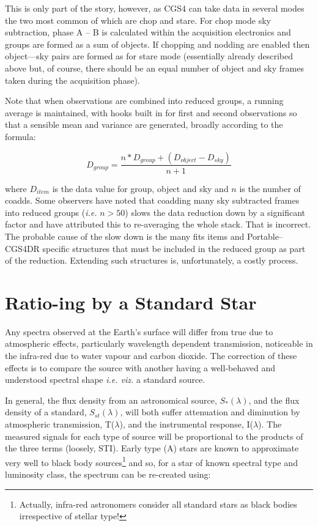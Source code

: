 \documentclass[a4paper]{book}
\renewcommand{\_}{{\tt\char'137}}
\begin{document}
This is only part of the story, however, as CGS4 can take data in several
modes the two most common of which are {\sc chop} and {\sc stare}.  For
{\sc chop} mode sky subtraction, phase A -- B is calculated within the
acquisition electronics and groups are formed as a sum of objects. If
chopping and nodding are enabled then {\sc object---sky} pairs are formed
as for {\sc stare} mode (essentially already described above but, of
course, there should be an equal number of {\sc object} and {\sc sky}
frames taken during the acquisition phase). 

Note that when observations are combined into reduced groups, a running
average is maintained, with hooks built in for first and second
observations so that a sensible mean and variance are generated, broadly
according to the formula: 

\begin{equation}
D_{group} = \frac{n*D_{group} + (D_{object} - D_{sky})}{n+1} \label{equation_4}
\end{equation}

where $D_{item}$ is the data value for group, object and sky and $n$ is
the number of coadds. Some observers have noted that coadding many sky
subtracted frames into reduced groups ({\em i.e.} $ n > 50 $) slows the
data reduction down by a significant factor and have attributed this to
re-averaging the whole stack. That is incorrect. The probable cause of the
slow down is the many {\sc fits} items and Portable--CGS4DR specific
structures that must be included in the reduced group as part of the
reduction. Extending such structures is, unfortunately, a costly process. 

\section{Ratio-ing by a Standard Star}
Any spectra observed at the Earth's surface will differ from true due to
atmospheric effects, particularly wavelength dependent transmission,
noticeable in the infra-red due to water vapour and carbon dioxide.
The correction of these effects is to compare the source with another
having a well-behaved and understood spectral shape {\em i.e. viz.} a
standard source. 

In general, the flux density from an astronomical source,
$S_{*}(\lambda)$, and the flux density of a standard, $S_{st}(\lambda)$,
will both suffer attenuation and diminution by atmospheric transmission,
T($\lambda$), and the instrumental response, I($\lambda$). The measured
signals for each type of source will be proportional to the products of
the three terms (loosely, STI). Early type (A) stars are known to
approximate very well to black body sources\footnote[3]{Actually,
infra-red astronomers consider all standard stars as black bodies
irrespective of stellar type!} and so, for a star of known spectral type
and luminosity class, the spectrum can be re-created using: 
\end{document}

